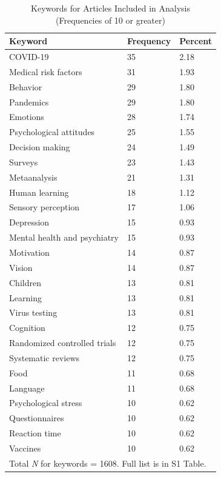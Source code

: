\documentclass[authordate, empirical]{jote-new-article}
\begin{document}
	\begin{table}
		\centering
		\begin{fullwidth}
			\caption{Keywords for Articles Included in Analysis\\ (Frequencies of 10 or greater)}
			\begin{tabularx}{\linewidth}{@{} l X X @{}}
				\toprule
				\textbf{Keyword} & \textbf{Frequency} & \textbf{Percent} \\
				\midrule
				COVID-19 & 35 & 2.18 \\
				Medical risk factors & 31 & 1.93 \\
				Behavior & 29 & 1.80 \\
				Pandemics & 29 & 1.80 \\
				Emotions & 28 & 1.74 \\
				Psychological attitudes & 25 & 1.55 \\
				Decision making & 24 & 1.49 \\
				Surveys & 23 & 1.43 \\
				Metaanalysis & 21 & 1.31 \\
				Human learning & 18 & 1.12 \\
				Sensory perception & 17 & 1.06 \\
				Depression & 15 & 0.93 \\
				Mental health and psychiatry & 15 & 0.93 \\
				Motivation & 14 & 0.87 \\
				Vision & 14 & 0.87 \\
				Children & 13 & 0.81 \\
				Learning & 13 & 0.81 \\
				Virus testing & 13 & 0.81 \\
				Cognition & 12 & 0.75 \\
				Randomized controlled trials & 12 & 0.75 \\
				Systematic reviews & 12 & 0.75 \\
				Food & 11 & 0.68 \\
				Language & 11 & 0.68 \\
				Psychological stress & 10 & 0.62 \\
				Questionnaires & 10 & 0.62 \\
				Reaction time & 10 & 0.62 \\
				Vaccines & 10 & 0.62 \\
				\bottomrule
				\multicolumn{3}{l}{Total \emph{N} for keywords = 1608.  Full list is in S1 Table.} \\
				
			\end{tabularx}
		\end{fullwidth}
	\end{table}
	
\end{document}
